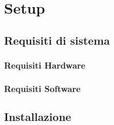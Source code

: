 \section{Setup}


\subsection{Requisiti di sistema}



\subsubsection{Requisiti Hardware}


\subsubsection{Requisiti Software}







\subsection{Installazione}




